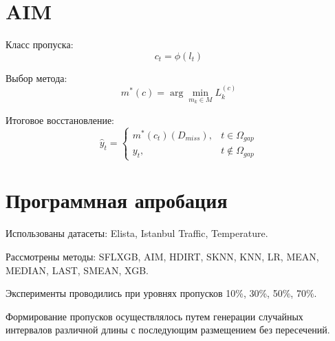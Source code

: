 \documentclass[conference]{IEEEtran}
\begin{document}
\section{AIM}

Класс пропуска:
\begin{equation}
c_t = \phi(l_t)
\end{equation}

Выбор метода:
\begin{equation}
m^*(c) = \arg\min_{m_k \in M} L_k^{(c)}
\end{equation}

Итоговое восстановление:
\begin{equation}
\hat{y}_t =
\begin{cases}
m^*(c_t)(D_{miss}), & t \in \Omega_{gap} \\
y_t, & t \notin \Omega_{gap}
\end{cases}
\end{equation}

\section{Программная апробация}

Использованы датасеты: Elista, Istanbul Traffic, Temperature.

Рассмотрены методы: SFLXGB, AIM, HDIRT, SKNN, KNN, LR, MEAN, MEDIAN, LAST, SMEAN, XGB.

Эксперименты проводились при уровнях пропусков 10\%, 30\%, 50\%, 70\%.

Формирование пропусков осуществлялось путем генерации случайных интервалов различной длины с последующим размещением без пересечений.
\end{document}
